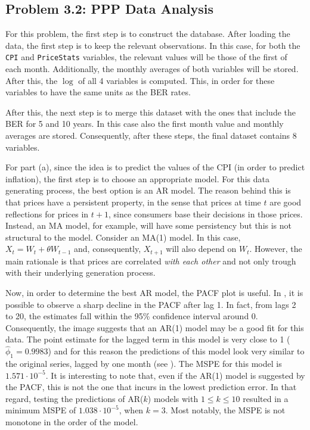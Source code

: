 \documentclass[11pt, english]{article}
\begin{document}
\begin{multicols}{2}
\section*{Problem 3.2: PPP Data Analysis}
  
For this problem, the first step is to construct the database. After loading the data, the first step is to keep the relevant observations. In this case, for both the \texttt{CPI} and \texttt{PriceStats} variables, the relevant values will be those of the first of each month. Additionally, the monthly averages of both variables will be stored. After this, the $\log$ of all 4 variables is computed. This, in order for these variables to have the same units as the BER rates.

After this, the next step is to merge this dataset with the ones that include the BER for 5 and 10 years. In this case also the first month value and monthly averages are stored. Consequently, after these steps, the final dataset contains 8 variables.
 
For part (a), since the idea is to predict the values of the CPI (in order to predict inflation), the first step is to choose an appropriate model. For this data generating process, the best option is an AR model. The reason behind this is that prices have a persistent property, in the sense that prices at time $t$ are good reflections for prices in $t+1$, since consumers base their decisions in those prices. Instead, an MA model, for example, will have some persistency but this is not structural to the model. Consider an MA(1) model. In this case, $X_{t} = W_{t} + \theta W_{t-1}$ and, consequently, $X_{t+1}$ will also depend on $W_{t}$. However, the main rationale is that prices are correlated \textit{with each other} and not only trough with their underlying generation process.

Now, in order to determine the best AR model, the PACF plot is useful. In , it is possible to observe a sharp decline in the PACF after lag 1. In fact, from lags 2 to 20, the estimates fall within the 95\% confidence interval around 0. Consequently, the image suggests that an AR(1) model may be a good fit for this data. The point estimate for the lagged term in this model is very close to 1 ($\hat{\phi}_{1} = 0.9983$) and for this reason the predictions of this model look very similar to the original series, lagged by one month (see ). The MSPE for this model is $1.571 \cdot 10^{-5}$. It is interesting to note that, even if the AR(1) model is suggested by the PACF, this is not the one that incurs in the lowest prediction error. In that regard, testing the predictions of AR($k$) models with $1 \leq k \leq 10$ resulted in a minimum MSPE of $1.038\cdot 10^{-5}$, when $k = 3$. Most notably, the MSPE is not monotone in the order of the model.


\end{multicols}
\end{document}
